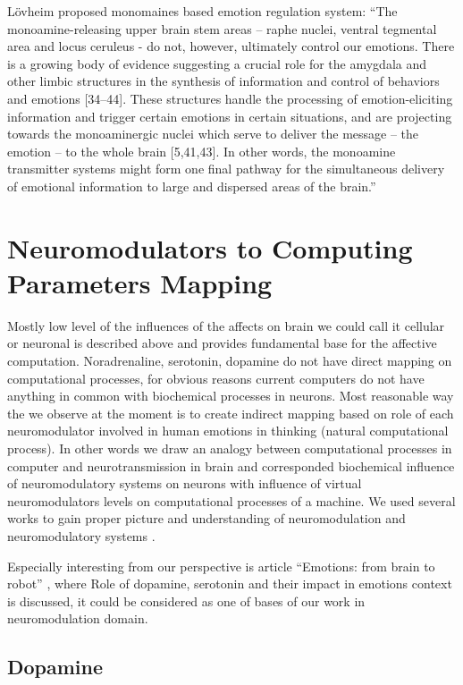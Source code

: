 L\"{o}vheim proposed monomaines based emotion regulation system: ``The monoamine-releasing upper brain stem areas – raphe nuclei, ventral tegmental area and locus ceruleus - do not, however, ultimately control our emotions. There is a growing body of evidence suggesting a crucial role for the amygdala and other limbic structures in the synthesis of information and control of behaviors and emotions [34–44]. These structures handle the processing of emotion-eliciting information and trigger certain emotions in certain situations, and are projecting towards the monoaminergic nuclei which serve to deliver the message – the emotion – to the whole brain [5,41,43]. In other words, the monoamine transmitter systems might form one final pathway for the simultaneous delivery of emotional information to large and dispersed areas of the brain.''

\section{Neuromodulators to Computing Parameters Mapping}

Mostly low level of the influences of the affects on brain we could call it cellular or neuronal is described above and provides fundamental base for the affective computation. Noradrenaline, serotonin, dopamine do not have direct mapping on computational processes, for obvious reasons current computers do not have anything in common with biochemical processes in neurons. Most reasonable way the we observe at the moment is to create indirect mapping based on role of each neuromodulator involved in human emotions in thinking (natural computational process). In other words we draw an analogy between computational processes in computer and neurotransmission in brain and corresponded biochemical influence of neuromodulatory systems on neurons with influence of virtual neuromodulators levels on computational processes of a machine. We used several works to gain proper picture and understanding of neuromodulation and neuromodulatory systems \cite{cubeofemotions, neuromodulatory, on_role_of_emotion}. 

Especially interesting from our perspective is article ``Emotions: from brain to robot'' \cite{emotionsbraintorobot}, where Role of dopamine, serotonin and their impact in emotions context is discussed, it could be considered as one of bases of our work in neuromodulation domain.

\subsection{Dopamine}


